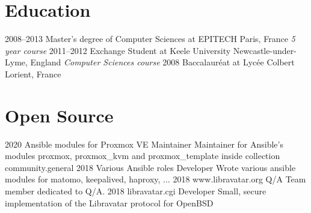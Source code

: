 \documentclass[]{friggeri-cv} %
\begin{document}

\section{Education}

\begin{entrylist}
\entry
{2008--2013}
{Master's degree {\normalfont of Computer Sciences at EPITECH}}
{Paris, France}
{\emph{5 year course}}
\entry
{2011--2012}
{Exchange Student {\normalfont at Keele University}}
{Newcastle-under-Lyme, England}
{\emph{Computer Sciences course}}
\entry
{2008}
{Baccalauréat {\normalfont at Lycée Colbert}}
{Lorient, France}
{}
\end{entrylist}


\section{Open Source}
\begin{entrylist}
\entry
{2020}
{Ansible modules for Proxmox VE}
{Maintainer}
{Maintainer for Ansible's modules proxmox, proxmox\_kvm and proxmox\_template inside collection community.general}
\entry
{2018}
{Various Ansible roles}
{Developer}
{Wrote various ansible modules for matomo, keepalived, haproxy, ...}
\entry
{2018}
{www.libravatar.org}
{Q/A}
{Team member dedicated to Q/A.}
\entry
{2018}
{libravatar.cgi}
{Developer}
{Small, secure implementation of the Libravatar protocol for OpenBSD}
\end{entrylist}
\end{document}

